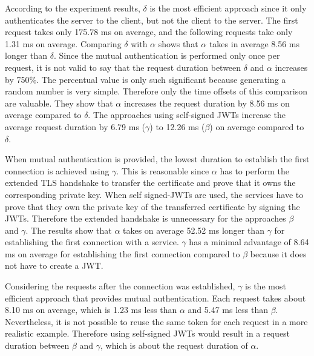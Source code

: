 According to the experiment results, $\delta$ is the most efficient approach since it only authenticates the server to the client, but not the client to the server.
The first request takes only 175.78 ms on average, and the following requests take only 1.31 ms on average.
Comparing $\delta$ with $\alpha$ shows that $\alpha$ takes in average 8.56 ms longer than $\delta$.
Since the mutual authentication is performed only once per request, it is not valid to say that the request duration between $\delta$ and $\alpha$ increases by 750\%.
The percentual value is only such significant because generating a random number is very simple.
Therefore only the time offsets of this comparison are valuable.
They show that $\alpha$ increases the request duration by 8.56 ms on average compared to $\delta$.
The approaches using self-signed JWTs increase the average request duration by 6.79 ms ($\gamma$) to 12.26 ms ($\beta$) on average compared to $\delta$. 

When mutual authentication is provided, the lowest duration to establish the first connection is achieved using $\gamma$.
This is reasonable since $\alpha$ has to perform the extended TLS handshake to transfer the certificate and prove that it owns the corresponding private key.
When self signed-JWTs are used, the services have to prove that they own the private key of the transferred certificate by signing the JWTs.
Therefore the extended handshake is unnecessary for the approaches $\beta$ and $\gamma$.
The results show that $\alpha$ takes on average 52.52 ms longer than $\gamma$ for establishing the first connection with a service.
$\gamma$ has a minimal advantage of 8.64 ms on average for establishing the first connection compared to $\beta$ because it does not have to create a JWT.

Considering the requests after the connection was established, $\gamma$ is the most efficient approach that provides mutual authentication.
Each request takes about 8.10 ms on average, which is 1.23 ms less than $\alpha$ and 5.47 ms less than $\beta$.
Nevertheless, it is not possible to reuse the same token for each request in a more realistic example.
Therefore using self-signed JWTs would result in a request duration between $\beta$ and $\gamma$, which is about the request duration of $\alpha$.

